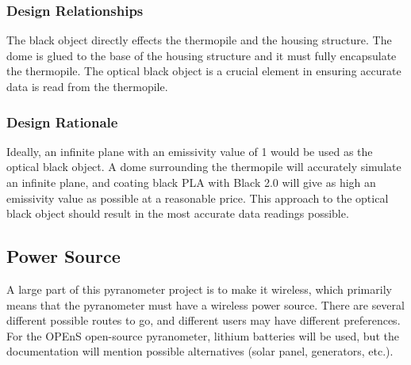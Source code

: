 \documentclass[10pt,draftclsnofoot,onecolumn,letterpaper]{article}
\begin{document}
\subsubsection{Design Relationships}
The black object directly effects the thermopile and the housing structure. The dome is glued to the base of the housing structure and it must fully encapsulate the thermopile. The optical black object is a crucial element in ensuring accurate data is read from the thermopile.
\subsubsection{Design Rationale}
Ideally, an infinite plane with an emissivity value of 1 would be used as the optical black object. A dome surrounding the thermopile will accurately simulate an infinite plane, and coating black PLA with Black 2.0 will give as high an emissivity value as possible at a reasonable price. This approach to the optical black object should result in the most accurate data readings possible.

\subsection{Power Source}
A large part of this pyranometer project is to make it wireless, which primarily means that the pyranometer must have a wireless power source. There are several different possible routes to go, and different users may have different preferences. For the OPEnS open-source pyranometer, lithium batteries will be used, but the documentation will mention possible alternatives (solar panel, generators, etc.). 
\end{document}
